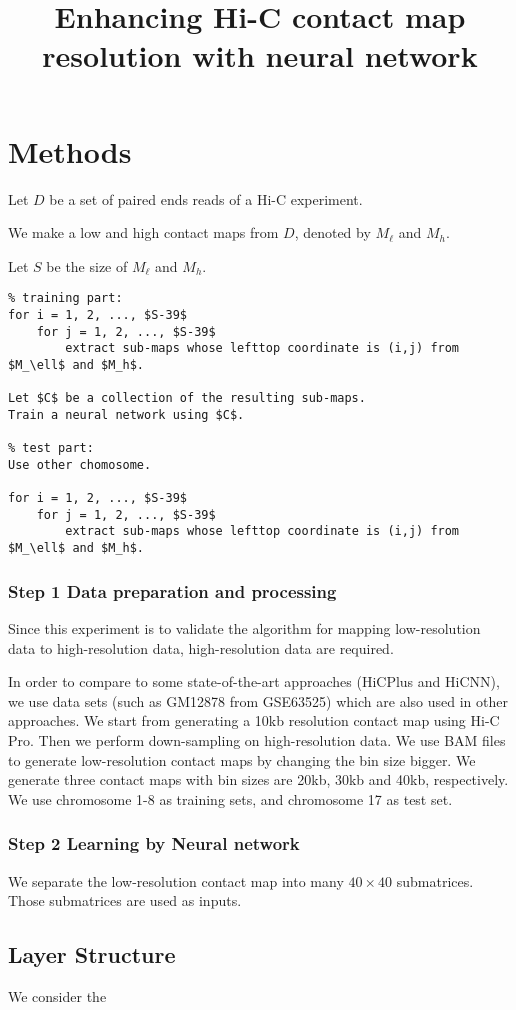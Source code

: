 \documentclass{article}
\begin{document}
\title{Enhancing Hi-C contact map resolution with neural network}
\author{}
\maketitle



\section{Methods}


Let $D$ be a set of paired ends reads of a Hi-C experiment. 

We make a low and high contact maps from $D$, denoted by $M_\ell$ and $M_h$. 

Let $S$ be the size of $M_\ell$ and $M_h$. 


\begin{verbatim}
% training part: 
for i = 1, 2, ..., $S-39$
    for j = 1, 2, ..., $S-39$
        extract sub-maps whose lefttop coordinate is (i,j) from $M_\ell$ and $M_h$. 

Let $C$ be a collection of the resulting sub-maps. 
Train a neural network using $C$. 

% test part: 
Use other chomosome. 

for i = 1, 2, ..., $S-39$
    for j = 1, 2, ..., $S-39$
        extract sub-maps whose lefttop coordinate is (i,j) from $M_\ell$ and $M_h$. 

\end{verbatim}






\subsubsection*{Step 1 Data preparation and processing}
Since this experiment is to validate the algorithm for mapping low-resolution data to high-resolution data, 
high-resolution data are required. 

In order to compare to some state-of-the-art approaches (HiCPlus and HiCNN), 
we use data sets (such as GM12878 from GSE63525) which are also used in other approaches. 
We start from generating a 10kb resolution contact map 
using Hi-C Pro. 
Then we perform down-sampling on high-resolution data. 
We use BAM files to generate low-resolution contact maps by changing the bin size bigger. 
We generate three contact maps with bin sizes are 20kb, 30kb and 40kb, respectively. 
We use chromosome 1-8 as training sets, and chromosome 17 as test set.

\subsubsection*{Step 2 Learning by Neural network}
We separate the low-resolution contact map into many $40 \times 40$ submatrices. 
Those submatrices are used as inputs.

\subsection{Layer Structure}
We consider the 





 
\end{document}
